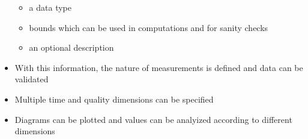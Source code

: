\begin{frame}[t]
\begin{itemize}
{\begin{itemize}
{{\begin{itemize}
\item<15-> \texttt{increasingStrictly}, like the \measureFEs\ in our example -- no two log points can have the same value in this dimension%
\end{itemize}%
}}%
%
\item<16-> a data type%
%
\item<23-> bounds which can be used in computations and for sanity checks%
%
\item<27-> an optional description%
%
\end{itemize}%
}%
%
\item<28-> With this information, the nature of measurements is defined and data can be validated%
\item<29-> Multiple time and quality dimensions can be specified%
\item<30-> Diagrams can be plotted and values can be analyized according to different dimensions%
%
\end{itemize}%
\end{frame}%
%
